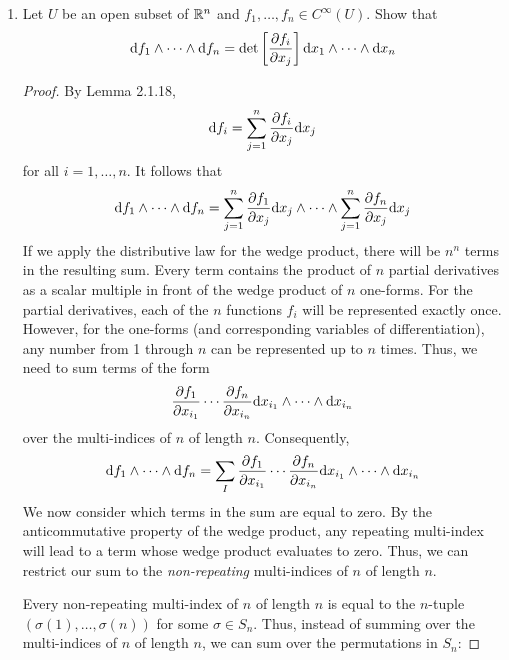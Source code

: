 \documentclass[../psets.tex]{subfiles}
\begin{document}
\begin{enumerate}[label={\textbf{2.3.\roman*.}}]
\begin{enumerate}
\begin{proof}
\begin{align*}
                ={}& 0
            \end{align*}
        \end{proof}
    \end{enumerate}
    \item Let $U$ be an open subset of $\mathbb{R}^n$ and $f_1,\dots,f_n\in C^\infty(U)$. Show that
    \begin{equation*}
        \dd{f_1}\wedge\cdots\wedge\dd{f_n} = \det\left[ \pdv{f_i}{x_j} \right]\dd{x_1}\wedge\cdots\wedge\dd{x_n}
    \end{equation*}
    \begin{proof}
        By Lemma 2.1.18,
        \begin{equation*}
            \dd f_i = \sum_{j=1}^n\pdv{f_i}{x_j}\dd x_j
        \end{equation*}
        for all $i=1,\dots,n$. It follows that
        \begin{equation*}
            \dd{f_1}\wedge\cdots\wedge\dd{f_n} = \sum_{j=1}^n\pdv{f_1}{x_j}\dd x_j\wedge\cdots\wedge\sum_{j=1}^n\pdv{f_n}{x_j}\dd x_j
        \end{equation*}
        If we apply the distributive law for the wedge product, there will be $n^n$ terms in the resulting sum. Every term contains the product of $n$ partial derivatives as a scalar multiple in front of the wedge product of $n$ one-forms. For the partial derivatives, each of the $n$ functions $f_i$ will be represented exactly once. However, for the one-forms (and corresponding variables of differentiation), any number from 1 through $n$ can be represented up to $n$ times. Thus, we need to sum terms of the form
        \begin{equation*}
            \pdv{f_1}{x_{i_1}}\cdots\pdv{f_n}{x_{i_n}}\dd x_{i_1}\wedge\cdots\wedge\dd x_{i_n}
        \end{equation*}
        over the multi-indices of $n$ of length $n$. Consequently,
        \begin{equation*}
            \dd{f_1}\wedge\cdots\wedge\dd{f_n} = \sum_I\pdv{f_1}{x_{i_1}}\cdots\pdv{f_n}{x_{i_n}}\dd x_{i_1}\wedge\cdots\wedge\dd x_{i_n}
        \end{equation*}
        We now consider which terms in the sum are equal to zero. By the anticommutative property of the wedge product, any repeating multi-index will lead to a term whose wedge product evaluates to zero. Thus, we can restrict our sum to the \emph{non-repeating} multi-indices of $n$ of length $n$.\par
        Every non-repeating multi-index of $n$ of length $n$ is equal to the $n$-tuple $(\sigma(1),\dots,\sigma(n))$ for some $\sigma\in S_n$. Thus, instead of summing over the multi-indices of $n$ of length $n$, we can sum over the permutations in $S_n$:

\end{proof}
\end{enumerate}
\end{document}
